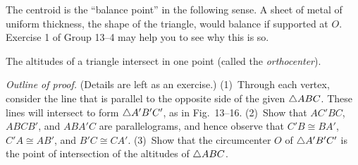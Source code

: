 \documentclass[11pt]{book}
\begin{document}
The centroid is the ``balance point'' in the following sense. A sheet of metal
of uniform thickness, the shape of the triangle, would balance if supported at
$O$. Exercise 1 of Group 13--4 may help you to see why this is so.

\FIGXIIIFIFTEENSIXTEEN

\begin{theorem}
The altitudes of a triangle intersect in one point (called the
\emph{orthocenter}).
\end{theorem}

\noindent\emph{Outline of proof.} (Details are left as an exercise.)
(1)~Through each vertex, consider the line that is parallel to the opposite side
of the given $\triangle ABC$. These lines will intersect to form $\triangle A'B'C'$, as
in Fig.~13--16. (2)~Show that $AC'BC$, $ABCB'$, and $ABA'C$ are parallelograms,
and hence observe that $C'B \cong BA'$, $C'A \cong AB'$, and $B'C \cong CA'$.
(3)~Show that the circumcenter $O$ of $\triangle A'B'C'$ is the point of
intersection of the altitudes of $\triangle ABC$.

\end{document}
